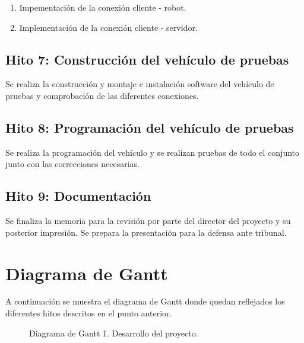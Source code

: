 \begin{enumerate}
 \item Impementación de la conexión cliente - robot.
 \item Implementación de la conexión cliente - servidor.
\end{enumerate}


\subsection{Hito 7: Construcción del vehículo de pruebas }
\label{subsec:hito6}

Se realiza la construcción y montaje e instalación software del vehículo de pruebas y comprobación de las diferentes conexiones.

\subsection{Hito 8: Programación del vehículo de pruebas }
\label{subsec:hito6}

Se realiza la programación del vehículo y se realizan pruebas de todo el conjunto junto con las correcciones necesarias.


\subsection{Hito 9: Documentación }
\label{subsec:hito6}

Se finaliza la memoria para la revisión por parte del director del proyecto y su posterior impresión. Se prepara la presentación para la defensa ante tribunal.


\section{Diagrama de Gantt}

A continuación se muestra el diagrama de Gantt donde quedan reflejados los diferentes hitos descritos en el punto anterior.

\begin{figure}
  \caption{Diagrama de Gantt 1. Desarrollo del proyecto.}
\end{figure}

